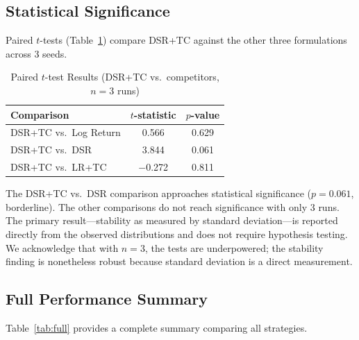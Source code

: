 \documentclass[conference]{IEEEtran}
\begin{document}
\subsection{Statistical Significance}
Paired $t$-tests (Table~\ref{tab:ttest}) compare DSR+TC against the other three
formulations across 3 seeds.

\begin{table}[t]
\caption{Paired $t$-test Results (DSR+TC vs.\ competitors, $n=3$ runs)}
\label{tab:ttest}
\centering
\begin{tabular}{lcc}
\toprule
Comparison & $t$-statistic & $p$-value \\
\midrule
DSR+TC vs.\ Log Return  & 0.566 & 0.629 \\
DSR+TC vs.\ DSR         & 3.844 & 0.061 \\
DSR+TC vs.\ LR+TC       & $-$0.272 & 0.811 \\
\bottomrule
\end{tabular}
\end{table}

The DSR+TC vs.\ DSR comparison approaches statistical significance ($p = 0.061$,
borderline). The other comparisons do not reach significance with only 3 runs.
The primary result—stability as measured by standard deviation—is reported
directly from the observed distributions and does not require hypothesis testing.
We acknowledge that with $n=3$, the tests are underpowered; the stability finding
is nonetheless robust because standard deviation is a direct measurement.

\subsection{Full Performance Summary}
Table~\ref{tab:full} provides a complete summary comparing all strategies.

\begin{table}[t]
\caption{Complete Performance Summary (Test Period, Best Seed per Method)}
\label{tab:full}
\centering
{}
\end{table}
\end{document}
